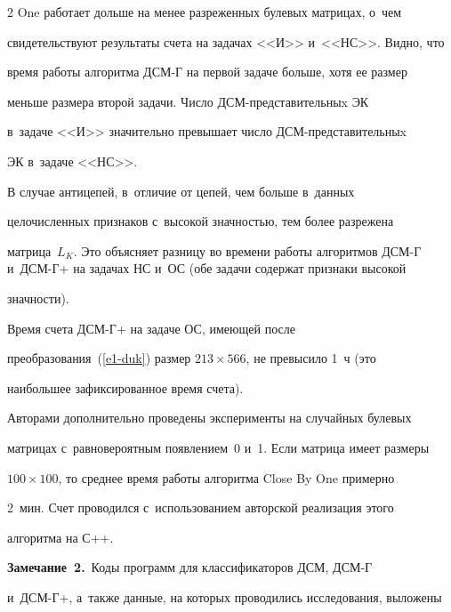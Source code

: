 \begin{multicols}{2}
One работает дольше на менее разреженных булевых матрицах, о~чем 


свидетельствуют результаты счета на задачах <<И>> и~<<НС>>. Видно, что 


время работы алгоритма ДСМ-Г на первой задаче больше, хотя ее размер 


меньше размера второй задачи. Число ДСМ-пред\-ста\-ви\-тель\-ныx ЭК 


в~задаче <<И>> значительно превышает число ДСМ-пред\-ста\-ви\-тель\-ныx 


ЭК в~задаче <<НС>>. 


  


  В случае антицепей, в~отличие от цепей, чем больше в~данных 


целочисленных признаков с~высокой значностью, тем более разрежена 


матрица~$L_K$. Это объясняет разницу во времени работы алгоритмов ДСМ-Г и~ДСМ-Г+ на задачах НС и~ОС (обе задачи содержат признаки высокой 


значности).


  


  Время счета ДСМ-Г+ на задаче ОС, имеющей после  


преобразования~(\ref{e1-duk}) размер $213\times 566$, не превысило 1~ч (это 


наибольшее зафиксированное время счета).


  


  Авторами дополнительно проведены эксперименты на случайных булевых 


матрицах с~равновероятным появлением~0 и~1. Если матрица имеет размеры 


$100\times100$, то среднее время работы алгоритма Close By One примерно 


2~мин. Счет проводился с~использованием авторской реализация этого 


алгоритма на С++. 


  


  \smallskip


  


  \noindent


  \textbf{Замечание~2.}\ Коды программ для классификаторов ДСМ, ДСМ-Г 


и~ДСМ-Г+, а~также данные, на которых проводились исследования, выложены 



\end{multicols}
